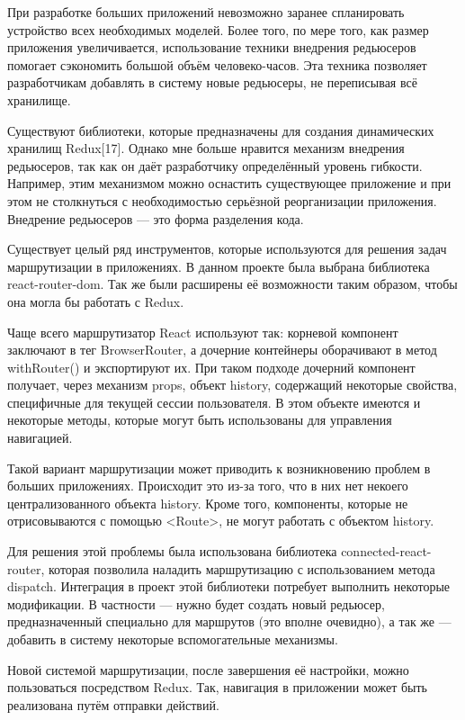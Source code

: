 При разработке больших приложений невозможно заранее спланировать устройство всех необходимых моделей.
Более того, по мере того, как размер приложения увеличивается, использование техники внедрения редьюсеров помогает сэкономить большой объём человеко-часов.
Эта техника позволяет разработчикам добавлять в систему новые редьюсеры, не переписывая всё хранилище.

Существуют библиотеки, которые предназначены для создания динамических хранилищ Redux[17].
Однако мне больше нравится механизм внедрения редьюсеров, так как он даёт разработчику определённый уровень гибкости.
Например, этим механизмом можно оснастить существующее приложение и при этом не столкнуться с необходимостью серьёзной реорганизации приложения.
Внедрение редьюсеров — это форма разделения кода.

Существует целый ряд инструментов, которые используются для решения задач маршрутизации в приложениях.
В данном проекте была выбрана библиотека react-router-dom.
Так же были расширены её возможности таким образом, чтобы она могла бы работать с Redux.

Чаще всего маршрутизатор React используют так: корневой компонент заключают в тег BrowserRouter, а дочерние контейнеры оборачивают в метод withRouter() и экспортируют их.
При таком подходе дочерний компонент получает, через механизм props, объект history, содержащий некоторые свойства, специфичные для текущей сессии пользователя.
В этом объекте имеются и некоторые методы, которые могут быть использованы для управления навигацией.

Такой вариант маршрутизации может приводить к возникновению проблем в больших приложениях.
Происходит это из-за того, что в них нет некоего централизованного объекта history.
Кроме того, компоненты, которые не отрисовываются с помощью <Route>, не могут работать с объектом history.

Для решения этой проблемы была использована библиотека connected-react-router, которая позволила наладить маршрутизацию с использованием метода dispatch.
Интеграция в проект этой библиотеки потребует выполнить некоторые модификации.
В частности — нужно будет создать новый редьюсер, предназначенный специально для маршрутов (это вполне очевидно), а так же — добавить в систему некоторые вспомогательные механизмы.

Новой системой маршрутизации, после завершения её настройки, можно пользоваться посредством Redux.
Так, навигация в приложении может быть реализована путём отправки действий.


